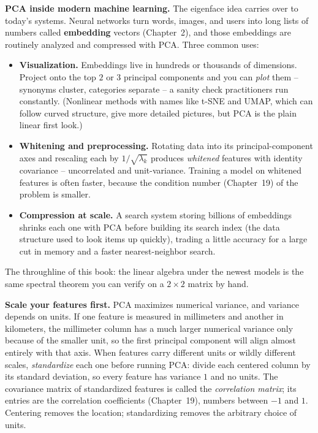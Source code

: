 \begin{applicationbox}
\textbf{PCA inside modern machine learning.} The eigenface idea carries over to
today's systems. Neural networks turn words, images, and users into long lists of
numbers called \textbf{embedding} vectors (Chapter~2), and those embeddings are
routinely analyzed and compressed with PCA. Three common uses:
\begin{itemize}
  \item \textbf{Visualization.} Embeddings live in hundreds or thousands of
        dimensions. Project onto the top $2$ or $3$ principal components and you can
        \emph{plot} them -- synonyms cluster, categories separate -- a sanity check
        practitioners run constantly. (Nonlinear methods with names like t-SNE and UMAP,
        which can follow curved structure, give more detailed pictures, but PCA is
        the plain linear first look.)
  \item \textbf{Whitening and preprocessing.} Rotating data into its
        principal-component axes and rescaling each by $1/\sqrt{\lambda_k}$
        produces \emph{whitened} features with identity covariance -- uncorrelated
        and unit-variance. Training a model on whitened features is often faster,
        because the condition number (Chapter~19) of the problem is smaller.
  \item \textbf{Compression at scale.} A search system storing billions of
        embeddings shrinks each one with PCA before building its search index (the
        data structure used to look items up quickly), trading a little accuracy
        for a large cut in memory and a faster nearest-neighbor search.
\end{itemize}
The throughline of this book: the linear algebra under the newest models is the
same spectral theorem you can verify on a $2\times2$ matrix by hand.
\end{applicationbox}

\begin{trapbox}
\textbf{Scale your features first.} PCA maximizes numerical variance, and variance
depends on units. If one feature is measured in millimeters and another in
kilometers, the millimeter column has a much larger numerical variance only
because of the smaller unit, so the first principal component will align almost
entirely with that axis. When features carry different units or wildly different scales,
\emph{standardize} each one before running PCA: divide each centered column by its
standard deviation, so every feature has variance $1$ and no units. The covariance
matrix of standardized features is called the \emph{correlation matrix}; its entries
are the correlation coefficients (Chapter~19), numbers between $-1$ and $1$. Centering removes the
location; standardizing removes the arbitrary choice of units.
\end{trapbox}

